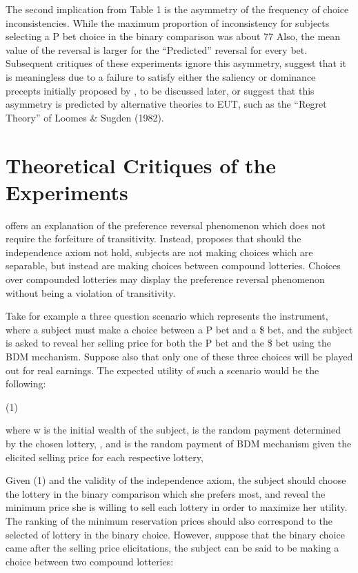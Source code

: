 \documentclass[../main.tex]{subfiles}
\begin{document}
The second implication from Table 1 is the asymmetry of the frequency of choice inconsistencies.
While the maximum proportion of inconsistency for subjects selecting a P bet choice in the binary comparison was about 77%
Also, the  mean value of the reversal is larger for the \enquote{Predicted} reversal for every bet.
Subsequent critiques of these experiments ignore this asymmetry, suggest that it is meaningless due to a failure to satisfy either the saliency or dominance precepts initially proposed by \textcite{Smith1982}, to be discussed later, or suggest that this asymmetry is predicted by alternative theories to EUT, such as the \enquote{Regret Theory} of  Loomes \& Sugden (1982).

\section{Theoretical Critiques of the \texorpdfstring{\textcite{Grether1979}}{Grether \& Plott (1979)} Experiments}

\textcite{Holt1986} offers an explanation of the preference reversal phenomenon which does not require the forfeiture of transitivity.
Instead, \textcite{Holt1986} proposes that should the independence axiom not hold, subjects are not making choices which are separable, but instead are making choices between compound lotteries.
Choices over compounded lotteries may display the preference reversal phenomenon without being a violation of transitivity.

Take for example a three question scenario which represents the \textcite{Grether1979} instrument, where a subject must make a choice between a P bet and a \$ bet, and the subject is asked to reveal her selling price for both the P bet and the \$ bet using the BDM mechanism.
Suppose also that only one of these three choices will be played out for real earnings.
The expected utility of such a scenario would be the following:

(1)	

where w is the initial wealth of the subject,  is the random payment determined by the chosen lottery, , and  is the random payment of BDM mechanism given the elicited selling price  for each respective lottery,

Given (1) and the validity of the independence axiom, the subject should choose the lottery in the binary comparison which she prefers most, and reveal the minimum price she is willing to sell each lottery in order to maximize her utility.
The ranking of the minimum reservation prices should also correspond to the selected of lottery in the binary choice.
However, suppose that the binary choice came after the selling price elicitations, the subject can be said to be making a choice between two compound lotteries:
\end{document}
